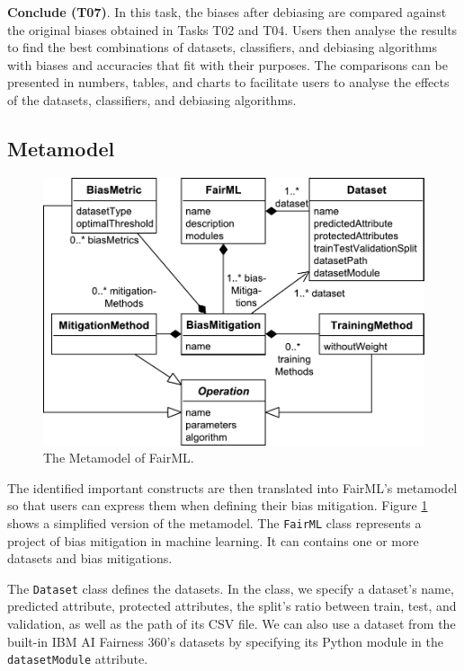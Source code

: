 \documentclass[sigconf,review]{acmart}
\begin{document}
\textbf{Conclude (T07)}. In this task, the biases after debiasing are compared against the original biases obtained in Tasks T02 and T04. Users then analyse the results to find the best combinations of datasets, classifiers, and debiasing algorithms with biases and accuracies that fit with their purposes. The comparisons can be presented in numbers, tables, and charts to facilitate users to analyse the effects of the datasets, classifiers, and debiasing algorithms. 

\subsection{Metamodel}
\label{sec:metamodel}

\begin{figure}
	\includegraphics[width=\linewidth]{figures/metamodel}
	\caption{The Metamodel of FairML.}
	\label{fig:metamodel}
\end{figure}

The identified important constructs are then translated into FairML's metamodel so that users can express them when defining their bias mitigation. Figure \ref{fig:metamodel} shows a simplified version of the metamodel. The \texttt{FairML} class represents a project of bias mitigation in machine learning. It can contains one or more datasets and bias mitigations. 

The \texttt{Dataset} class defines the datasets. In the class, we specify a dataset's name, predicted attribute, protected attributes, the split's ratio between train, test, and validation, as well as the path of its CSV file. We can also use a dataset from the built-in IBM AI Fairness 360's datasets by specifying its Python module in the \texttt{datasetModule} attribute.
\end{document}
